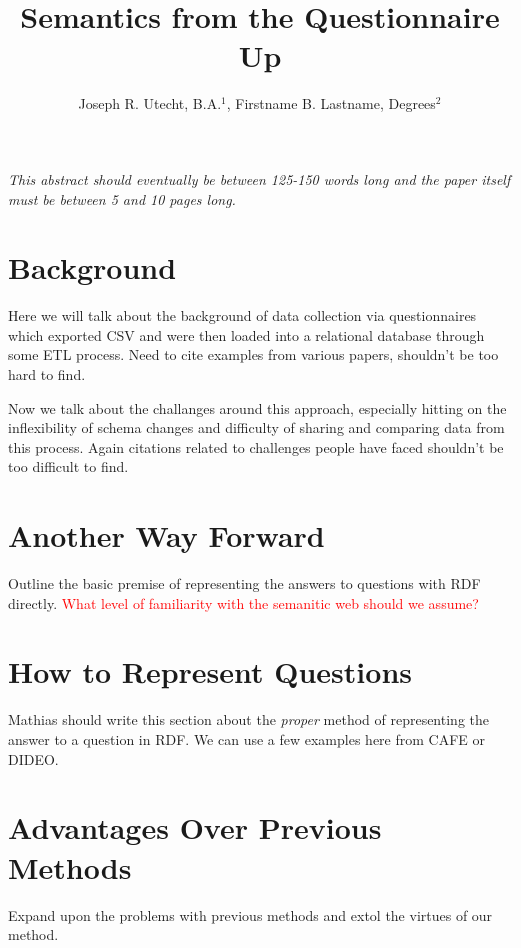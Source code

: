 \documentclass{amia}
\begin{document}
\title{Semantics from the Questionnaire Up}

\author{Joseph R. Utecht, B.A.$^{1}$, Firstname B. Lastname, Degrees$^{2}$}


\maketitle


\textit{This abstract should eventually be between 125-150 words long and the paper itself must be between 5 and 10 pages long.}

\section*{Background}
Here we will talk about the background of data collection via questionnaires which exported CSV and were then loaded into a relational database through some ETL process.  Need to cite examples from various papers, shouldn't be too hard to find.

Now we talk about the challanges around this approach, especially hitting on the inflexibility of schema changes and difficulty of sharing and comparing data from this process. Again citations related to challenges people have faced shouldn't be too difficult to find.

\section*{Another Way Forward}
Outline the basic premise of representing the answers to questions with RDF directly.
\textcolor{red}{What level of familiarity with the semanitic web should we assume?}

\section*{How to Represent Questions}
Mathias should write this section about the \emph{proper} method of representing the answer to a question in RDF. We can use a few examples here from CAFE or DIDEO.

\section*{Advantages Over Previous Methods}
Expand upon the problems with previous methods and extol the virtues of our method.
\end{document}
